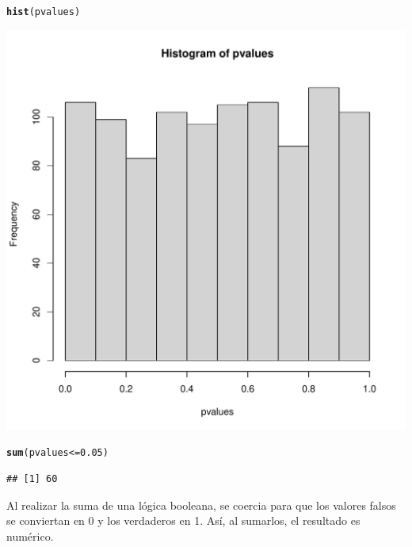 \documentclass{config/apuntes}\usepackage[]{graphicx}\usepackage[]{xcolor}
\makeatletter
\def\maxwidth{ %
  \ifdim\Gin@nat@width>\linewidth
    \linewidth
  \else
    \Gin@nat@width
  \fi
}
\newcommand{\hlnum}[1]{\textcolor[rgb]{0.686,0.059,0.569}{#1}}%
\newcommand{\hlopt}[1]{\textcolor[rgb]{0,0,0}{#1}}%
\newcommand{\hldef}[1]{\textcolor[rgb]{0.345,0.345,0.345}{#1}}%
\newcommand{\hlkwd}[1]{\textcolor[rgb]{0.737,0.353,0.396}{\textbf{#1}}}%
\newenvironment{kframe}{%
 \def\at@end@of@kframe{}%
 \ifinner\ifhmode%
  \def\at@end@of@kframe{\end{minipage}}%
  \begin{minipage}{\columnwidth}%
 \fi\fi%
 \def\FrameCommand##1{\hskip\@totalleftmargin \hskip-\fboxsep
 \colorbox{shadecolor}{##1}\hskip-\fboxsep
     \hskip-\linewidth \hskip-\@totalleftmargin \hskip\columnwidth}%
 \MakeFramed {\advance\hsize-\width
   \@totalleftmargin\z@ \linewidth\hsize
   \@setminipage}}%
 {\par\unskip\endMakeFramed%
 \at@end@of@kframe}
\newenvironment{knitrout}{}{} %
\makeatother
\begin{document}
\begin{knitrout}
\color{fgcolor}\begin{kframe}
\begin{alltt}
\hlkwd{hist}\hldef{(pvalues)}
\end{alltt}
\end{kframe}
\includegraphics[width=\maxwidth]{figure/unnamed-chunk-7-1} 
\begin{kframe}\begin{alltt}
\hlkwd{sum}\hldef{(pvalues} \hlopt{<=} \hlnum{0.05}\hldef{)}
\end{alltt}
\begin{verbatim}
## [1] 60
\end{verbatim}
\end{kframe}
\end{knitrout}

Al realizar la suma de una lógica booleana, se coercia para que los valores falsos se conviertan en 0 y los verdaderos en 1. Así, al sumarlos, el resultado es numérico. 
\end{document}
